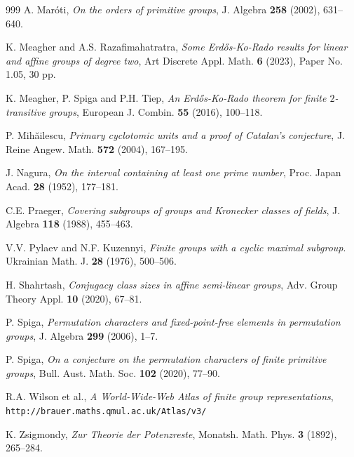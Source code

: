 \documentclass[twoside,a4paper,reqno,11pt]{amsart}
\newcommand{\<}{\langle}
\renewcommand{\>}{\rangle}
\theoremstyle{definition}
\begin{document}
\begin{thebibliography}{999}
		A. Maróti, \textit{On the orders of primitive groups}, J. Algebra \textbf{258} (2002), 631–640.
		
		K. Meagher and A.S. Razafimahatratra, \textit{Some Erdős-Ko-Rado results for linear and affine groups of degree two}, Art Discrete Appl. Math. \textbf{6} (2023), Paper No. 1.05, 30 pp.
		
		K. Meagher, P. Spiga and P.H. Tiep, \textit{An Erdős-Ko-Rado theorem for finite $2$-transitive groups}, European J. Combin. \textbf{55} (2016), 100–118.
		
		P. Mihăilescu, \textit{Primary cyclotomic units and a proof of Catalan's conjecture}, J. Reine Angew. Math. \textbf{572} (2004), 167–195.
		
		J. Nagura, \textit{On the interval containing at least one prime number}, Proc. Japan Acad. \textbf{28} (1952), 177–181.
		
		
		C.E. Praeger, \textit{Covering subgroups of groups and Kronecker classes of fields}, J. Algebra \textbf{118} (1988), 455–463.
		
		V.V. Pylaev and N.F. Kuzennyi, \textit{Finite groups with a cyclic maximal subgroup}. Ukrainian Math. J. \textbf{28} (1976), 500–506.
		
		H. Shahrtash, \textit{Conjugacy class sizes in affine semi-linear groups}, Adv. Group Theory Appl. \textbf{10} (2020), 67–81.
		
		P. Spiga, \textit{Permutation characters and fixed-point-free elements in permutation groups}, J. Algebra \textbf{299} (2006), 1–7.
		
		P. Spiga, \textit{On a conjecture on the permutation characters of finite primitive groups}, Bull. Aust. Math. Soc. \textbf{102} (2020), 77–90.
		
		R.A. Wilson et al., \emph{A {W}orld-{W}ide-{W}eb {A}tlas of finite group representations},  \\ {\texttt{http://brauer.maths.qmul.ac.uk/Atlas/v3/}}
		
		K. Zsigmondy, \textit{Zur Theorie der Potenzreste}, Monatsh. Math. Phys. \textbf{3} (1892), 265–284.
		
	\end{thebibliography}
	
\end{document}
